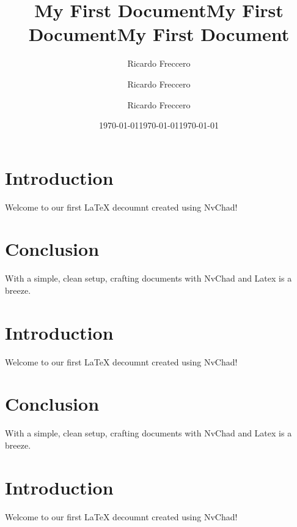 


\title{My First Document}
\author{Ricardo Freccero}

\date{\today}
\maketitle

\section{Introduction}
Welcome to our first LaTeX decoumnt created using NvChad!

\section{Conclusion}
With a simple, clean setup, crafting documents with NvChad and Latex is a breeze.




\title{My First Document}
\author{Ricardo Freccero}

\date{\today}
\maketitle

\section{Introduction}
Welcome to our first LaTeX decoumnt created using NvChad!

\section{Conclusion}
With a simple, clean setup, crafting documents with NvChad and Latex is a breeze.




\title{My First Document}
\author{Ricardo Freccero}

\date{\today}
\maketitle

\section{Introduction}
Welcome to our first LaTeX decoumnt created using NvChad!

